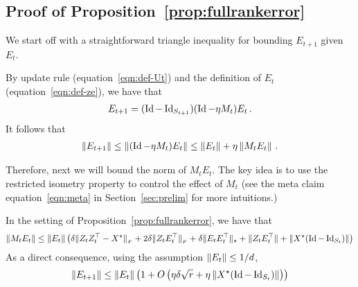 \subsection{Proof of Proposition~\ref{prop:fullrankerror}}
We start off with a straightforward triangle inequality for bounding $E_{t+1}$ given $E_t$.  
\begin{lem}
	By update rule (equation~\eqref{eqn:def-Ut}) and the definition of $E_t$ (equation~\eqref{eqn:def-ze}), we have that 
	\begin{align}
	E_{t+1} = (\operatorname{Id}-\operatorname{Id}_{S_{t+1}})(\operatorname{Id} - \eta M_t)E_t\,.\nonumber
	\end{align}
	It follows that 
	\begin{align}
	\left\|E_{t+1}\right\| \le \left\|(\operatorname{Id} - \eta M_t)E_t\right\| \le \left\|E_t\right\| + \eta \left\|M_tE_t\right\|\,.\label{eqn:33}
	\end{align}
\end{lem}
\noindent Therefore, next we will bound the norm of $M_tE_t$. The key idea is to use the restricted isometry property to control the effect of $M_t$ (see the meta claim equation~\eqref{eqn:meta} in Section~\ref{sec:prelim} for more intuitions.)
\begin{lem}\label{lem:norm_M_t}
	In the setting of Proposition~\ref{prop:fullrankerror}, we have that 
	\begin{align}
	\left\|M_tE_t\right\|\le \left\|E_t\right\| \left(\delta\|Z_tZ_t^\top - {X}^\star\|_{_{F}} + 2\delta \|Z_tE_t^\top\|_{_{F}} + \delta\|E_tE_t^\top\|_{\star} + \|Z_t E_t^{\top}\| + \left\|{X}^\star(\operatorname{Id} - \operatorname{Id}_{S_t})\right\|\right)\label{eqn:34}
	\end{align}
	As a direct consequence, using the assumption $\left\|E_t\right\|\le 1/d$,
	\begin{align}
	\left\|E_{t + 1}\right\| \leq \left\|E_t\right\|\left( 1 + O \left(\eta \delta \sqrt{r}  + \eta  \left\|{X}^\star(\operatorname{Id} - \operatorname{Id}_{S_t})\right\|  \right) \right)\label{eqn:31}
	\end{align}
\end{lem}

